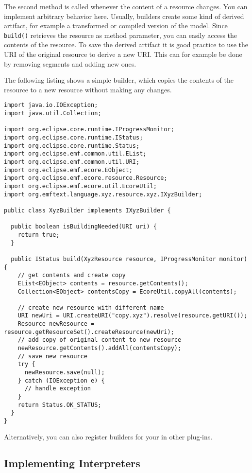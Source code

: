 The second method is called whenever the content of a resource changes. You can
implement arbitrary behavior here. Usually, builders create some kind of derived
artifact, for example a transformed or compiled version of the \DSL model. Since
\texttt{build()} retrieves the resource as method parameter, you can easily
access the contents of the resource. To save the derived artifact it is good
practice to use the URI of the original resource to derive a new URI. This can
for example be done by removing segments and adding new ones.

The following listing shows a simple builder, which copies the contents of the
resource to a new resource without making any changes.

\begin{lstlisting}
import java.io.IOException;
import java.util.Collection;

import org.eclipse.core.runtime.IProgressMonitor;
import org.eclipse.core.runtime.IStatus;
import org.eclipse.core.runtime.Status;
import org.eclipse.emf.common.util.EList;
import org.eclipse.emf.common.util.URI;
import org.eclipse.emf.ecore.EObject;
import org.eclipse.emf.ecore.resource.Resource;
import org.eclipse.emf.ecore.util.EcoreUtil;
import org.emftext.language.xyz.resource.xyz.IXyzBuilder;

public class XyzBuilder implements IXyzBuilder {
  
  public boolean isBuildingNeeded(URI uri) {
    return true;
  }
  
  public IStatus build(XyzResource resource, IProgressMonitor monitor) {
    // get contents and create copy 
    EList<EObject> contents = resource.getContents();
    Collection<EObject> contentsCopy = EcoreUtil.copyAll(contents);
    
    // create new resource with different name
    URI newUri = URI.createURI("copy.xyz").resolve(resource.getURI());
    Resource newResource = resource.getResourceSet().createResource(newUri);
    // add copy of original content to new resource
    newResource.getContents().addAll(contentsCopy);
    // save new resource
    try {
      newResource.save(null);
    } catch (IOException e) {
      // handle exception
    }
    return Status.OK_STATUS;
  }
}
\end{lstlisting}

Alternatively, you can also register builders for your \DSL in other plug-ins.

\subsection{Implementing Interpreters}
\label{sec:cust_interpreters}


